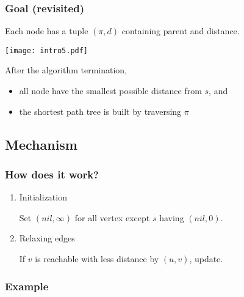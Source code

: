 \documentclass{beamer}
\begin{document}
\begin{frame}\frametitle{Goal (revisited)}

Each node has a tuple $(\pi,d)$ containing parent and distance.

\texttt{[image: intro5.pdf]}

After the algorithm termination,
\begin{itemize}
\item all node have the smallest possible distance from $s$, and
\item the shortest path tree is built by traversing $\pi$
\end{itemize}

\end{frame}

\subsection{Mechanism}

\begin{frame}\frametitle{How does it work?}

\begin{enumerate}

\item \alert{Initialization}

Set $(nil,\infty)$ for all vertex except $s$ having $(nil,0)$.\newline

\item \alert{Relaxing edges}

If $v$ is reachable with less distance by $(u,v)$, update. 


\end{enumerate}

\end{frame}

\begin{frame}\frametitle{Example}

\end{frame}
\end{document}
